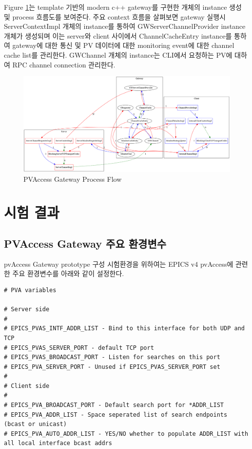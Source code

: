 \documentclass[11pt
  , a4paper
  , article
  , oneside
]{memoir}
\begin{document}
Figure \ref{fig:workflow}는 template 기반의 modern c++ gateway를 구현한 개체의 instance 생성 및 process 흐름도를 보여준다. 주요 context 흐름을 살펴보면 gateway 실행시 ServerContextImpl 개체의 instance를 통하여 GWServerChannelProvider instance 개체가 생성되며 이는 server와 client 사이에서 ChannelCacheEntry instance를 통하여 gateway에 대한 통신 및 PV 데이터에 대한 monitoring event에 대한 channel cache list를 관리한다. GWChannel 개체의 instance는 CLI에서 요청하는 PV에 대하여 RPC channel connection 관리한다.

\begin{figure}[!htb]
	\centering
	\includegraphics[width=1\textwidth, height=0.7\textheight]{./images/work_flow.png}
	\caption{
		PVAccess Gateway Process Flow
	}		
	\label{fig:workflow}   
\end{figure}

\clearpage

\section{시험 결과}
\subsection{PVAccess Gateway 주요 환경변수}
pvAccess Gateway prototype 구성 시험환경을 위하여는 EPICS v4 pvAccess에 관련한 주요 환경변수를 아래와 같이 설정한다.

\begin{lstlisting}[style=termstyle]
# PVA variables

# Server side
#
# EPICS_PVAS_INTF_ADDR_LIST - Bind to this interface for both UDP and TCP
# EPICS_PVAS_SERVER_PORT - default TCP port
# EPICS_PVAS_BROADCAST_PORT - Listen for searches on this port
# EPICS_PVA_SERVER_PORT - Unused if EPICS_PVAS_SERVER_PORT set
#
# Client side
#
# EPICS_PVA_BROADCAST_PORT - Default search port for *ADDR_LIST
# EPICS_PVA_ADDR_LIST - Space seperated list of search endpoints (bcast or unicast)
# EPICS_PVA_AUTO_ADDR_LIST - YES/NO whether to populate ADDR_LIST with all local interface bcast addrs


\end{lstlisting}
\end{document}
